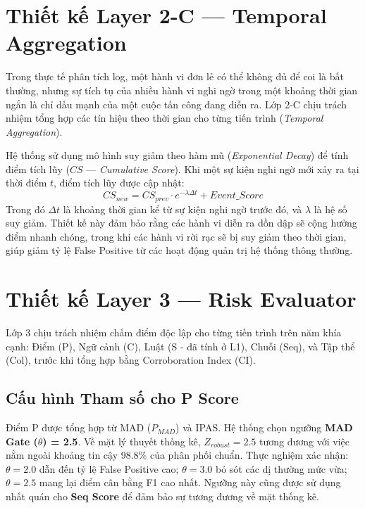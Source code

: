 \documentclass[../main.tex]{subfiles}
\begin{document}
\section{Thiết kế Layer 2-C — Temporal Aggregation}
\label{section:3.7}

Trong thực tế phân tích log, một hành vi đơn lẻ có thể không đủ để coi là bất thường, nhưng sự tích tụ của nhiều hành vi nghi ngờ trong một khoảng thời gian ngắn là chỉ dấu mạnh của một cuộc tấn công đang diễn ra. Lớp 2-C chịu trách nhiệm tổng hợp các tín hiệu theo thời gian cho từng tiến trình (\textit{Temporal Aggregation}).

Hệ thống sử dụng mô hình suy giảm theo hàm mũ (\textit{Exponential Decay}) để tính điểm tích lũy ($CS$ — \textit{Cumulative Score}). Khi một sự kiện nghi ngờ mới xảy ra tại thời điểm $t$, điểm tích lũy được cập nhật:
\begin{equation}
    CS_{new} = CS_{prev} \cdot e^{-\lambda \Delta t} + Event\_Score \tag{2.1}
\end{equation}
Trong đó $\Delta t$ là khoảng thời gian kể từ sự kiện nghi ngờ trước đó, và $\lambda$ là hệ số suy giảm. Thiết kế này đảm bảo rằng các hành vi diễn ra dồn dập sẽ cộng hưởng điểm nhanh chóng, trong khi các hành vi rời rạc sẽ bị suy giảm theo thời gian, giúp giảm tỷ lệ False Positive từ các hoạt động quản trị hệ thống thông thường.

\section{Thiết kế Layer 3 — Risk Evaluator}
\label{section:3.8}

Lớp 3 chịu trách nhiệm chấm điểm độc lập cho từng tiến trình trên năm khía cạnh: Điểm (P), Ngữ cảnh (C), Luật (S - đã tính ở L1), Chuỗi (Seq), và Tập thể (Col), trước khi tổng hợp bằng Corroboration Index (CI).

\subsection{Cấu hình Tham số cho P Score}
\label{subsection:3.7.1}

Điểm P được tổng hợp từ MAD ($P_{MAD}$) và IPAS. Hệ thống chọn ngưỡng \textbf{MAD Gate ($\theta$) = 2.5}. Về mặt lý thuyết thống kê, $Z_{robust} = 2.5$ tương đương với việc nằm ngoài khoảng tin cậy 98.8\% của phân phối chuẩn. Thực nghiệm xác nhận: $\theta = 2.0$ dẫn đến tỷ lệ False Positive cao; $\theta = 3.0$ bỏ sót các dị thường mức vừa; $\theta = 2.5$ mang lại điểm cân bằng F1 cao nhất. Ngưỡng này cũng được sử dụng nhất quán cho \textbf{Seq Score} để đảm bảo sự tương đương về mặt thống kê.
\end{document}
